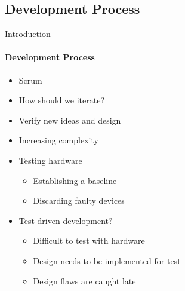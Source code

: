 \subsection{Development Process}
\begin{frame}[t]{Introduction}\framesubtitle{Development Process}
    \begin{itemize}
        \item<1-> Scrum
        \item<1-> How should we iterate?
        \item<2-> Verify new ideas and design
        \item<2-> Increasing complexity
        \item<3-> Testing hardware
            \begin{itemize}
                \item<3-> Establishing a baseline
                \item<3-> Discarding faulty devices
            \end{itemize}
        \item<4-> Test driven development?
        \begin{itemize}
            \item<4-> Difficult to test with hardware
            \item<4-> Design needs to be implemented for test
            \item<4-> Design flaws are caught late
        \end{itemize}
    \end{itemize}
\end{frame}

